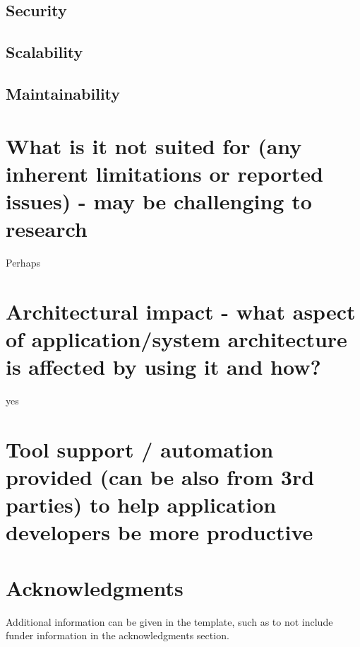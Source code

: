 \documentclass[fleqn,12pt]{olplainarticle}
\begin{document}
\subsection*{Security}
\subsection*{Scalability}
\subsection*{Maintainability}


\section*{What is it not suited for (any inherent limitations or reported issues) - may be challenging to research}

Perhaps

\section*{Architectural impact - what aspect of application/system architecture is affected by using it and how?}
yes
\section*{Tool support / automation provided (can be also from 3rd parties) to help application developers be more productive}

\section*{Acknowledgments}

Additional information can be given in the template, such as to not include funder information in the acknowledgments section.


\end{document}
